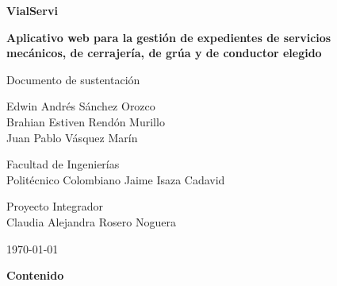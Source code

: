 \documentclass[12pt,letterpaper]{article}
\begin{document}
\thispagestyle{fancy}
\begin{center}
  \vspace*{2.5cm}
  {\LARGE\bfseries VialServi\par}
  \vspace{0.5cm}
  {\large\bfseries Aplicativo web para la gestión de expedientes de servicios\\
  mecánicos, de cerrajería, de grúa y de conductor elegido\par}

  \vspace{1cm}
  {\large Documento de sustentación\par}

  \vspace{2.5cm}
  Edwin Andrés Sánchez Orozco\\
  Brahian Estiven Rendón Murillo\\
  Juan Pablo Vásquez Marín

  \vspace{1cm}
  Facultad de Ingenierías\\
  Politécnico Colombiano Jaime Isaza Cadavid

  \vspace{1cm}
  Proyecto Integrador\\
  Claudia Alejandra Rosero Noguera

  \vspace{1cm}
  \today
\end{center}
\clearpage

\thispagestyle{fancy}
{\Large\bfseries Contenido\par}
\vspace{0.6cm}
{\singlespacing
\makeatletter
{}
\makeatother
}


\end{document}
